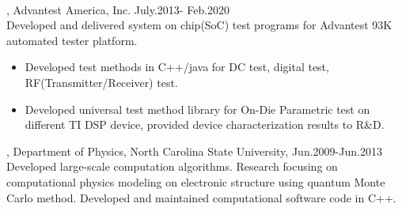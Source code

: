 \documentclass[11pt]{article} %
\begin{document}
\\
, Advantest America, Inc. July.2013- Feb.2020\\
\noindent Developed and delivered system on chip(SoC) test programs for Advantest 93K automated tester platform.\\ 
\begin{itemize}
    \item Developed test methods in C++/java for DC test, digital test, RF(Transmitter/Receiver) test.\\
 \vspace{-4mm}
    \item  Developed universal test method library for On-Die Parametric test on different TI DSP device, provided device characterization results to R\&D.\\ 
\vspace{-4mm}
 \end{itemize}
\vspace{1mm}
, Department of Physics, North Carolina State University, Jun.2009-Jun.2013\\
\noindent Developed large-scale computation algorithms. Research focusing on computational physics modeling on electronic structure using quantum Monte Carlo method. Developed and maintained computational software code in C++.\\
\end{document}
